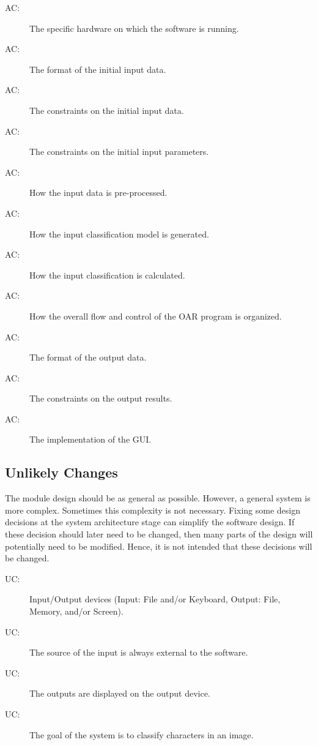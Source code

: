 \documentclass[12pt, titlepage]{article}
\newcounter{acnum}
\newcommand{\actheacnum}{AC\theacnum}
\newcounter{ucnum}
\newcommand{\uctheucnum}{UC\theucnum}
\begin{document}
\begin{description}
\item[ \actheacnum \label{acHardware}:] The specific
  hardware on which the software is running.
\item[ \actheacnum \label{acInput}:] The format of the
  initial input data.
\item[ \actheacnum \label{acInput2}:] The constraints on the initial input data.
\item[ \actheacnum \label{acInputParams}:] The constraints on the
initial input parameters.
\item[ \actheacnum \label{acPreprocess}:] How the input data is pre-processed.
\item[ \actheacnum \label{acModel}:] How the input classification model is generated.
\item[ \actheacnum \label{acCalc}:] How the input classification is calculated.
\item[ \actheacnum \label{acFlow}:] How the overall flow and control of the OAR program is organized.
\item[ \actheacnum \label{acOutput}:] The format of the
  output data.
\item[ \actheacnum \label{acOutput2}:] The constraints on the output results.
\item[ \actheacnum \label{acGui}:] The implementation of the GUI.
\end{description}

\subsection{Unlikely Changes} \label{SecUchange}

The module design should be as general as possible. However, a general system is
more complex. Sometimes this complexity is not necessary. Fixing some design
decisions at the system architecture stage can simplify the software design. If
these decision should later need to be changed, then many parts of the design
will potentially need to be modified. Hence, it is not intended that these
decisions will be changed.

\begin{description}
\item[ \uctheucnum \label{ucIO}:] Input/Output devices
  (Input: File and/or Keyboard, Output: File, Memory, and/or Screen).
\item[ \uctheucnum \label{ucInput}:] The source of the input is always external to the software.
\item[ \uctheucnum \label{ucOutput}:] The outputs are displayed on the output device.
\item[ \uctheucnum \label{ucGoal}:] The goal of the system is to classify characters in an image.

\end{description}
\end{document}
